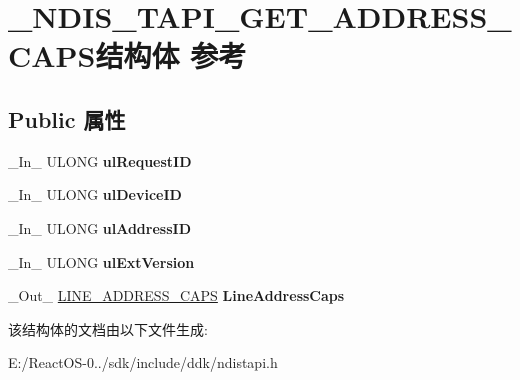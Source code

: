 \hypertarget{struct___n_d_i_s___t_a_p_i___g_e_t___a_d_d_r_e_s_s___c_a_p_s}{}\section{\+\_\+\+N\+D\+I\+S\+\_\+\+T\+A\+P\+I\+\_\+\+G\+E\+T\+\_\+\+A\+D\+D\+R\+E\+S\+S\+\_\+\+C\+A\+P\+S结构体 参考}
\label{struct___n_d_i_s___t_a_p_i___g_e_t___a_d_d_r_e_s_s___c_a_p_s}
\subsection*{Public 属性}
\begin{DoxyCompactItemize}
\item 
\mbox{\label{struct___n_d_i_s___t_a_p_i___g_e_t___a_d_d_r_e_s_s___c_a_p_s_aac46a28cfe9486a158bec383f89dc870}} 
\+\_\+\+In\+\_\+ U\+L\+O\+NG {\bfseries ul\+Request\+ID}
\item 
\mbox{\label{struct___n_d_i_s___t_a_p_i___g_e_t___a_d_d_r_e_s_s___c_a_p_s_ad23f8aee765a3e8d2d5ad858d40e5abb}} 
\+\_\+\+In\+\_\+ U\+L\+O\+NG {\bfseries ul\+Device\+ID}
\item 
\mbox{\label{struct___n_d_i_s___t_a_p_i___g_e_t___a_d_d_r_e_s_s___c_a_p_s_a3f2c71bd7fbbffa9b24fc8840de33a10}} 
\+\_\+\+In\+\_\+ U\+L\+O\+NG {\bfseries ul\+Address\+ID}
\item 
\mbox{\label{struct___n_d_i_s___t_a_p_i___g_e_t___a_d_d_r_e_s_s___c_a_p_s_a66a122512cc7a64c7e7b9444be474b43}} 
\+\_\+\+In\+\_\+ U\+L\+O\+NG {\bfseries ul\+Ext\+Version}
\item 
\mbox{\label{struct___n_d_i_s___t_a_p_i___g_e_t___a_d_d_r_e_s_s___c_a_p_s_a43cdfc0e92bd019180a69b4d79851156}} 
\+\_\+\+Out\+\_\+ \hyperlink{struct___l_i_n_e___a_d_d_r_e_s_s___c_a_p_s}{L\+I\+N\+E\+\_\+\+A\+D\+D\+R\+E\+S\+S\+\_\+\+C\+A\+PS} {\bfseries Line\+Address\+Caps}
\end{DoxyCompactItemize}


该结构体的文档由以下文件生成\+:\begin{DoxyCompactItemize}
\item 
E\+:/\+React\+O\+S-\/0../sdk/include/ddk/ndistapi.\+h\end{DoxyCompactItemize}
